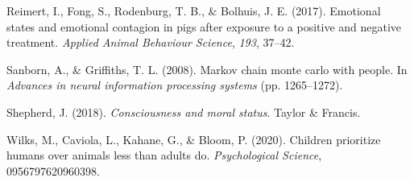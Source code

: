 \documentclass[10pt, letterpaper]{article}
\begin{document}
\leavevmode\hypertarget{ref-reimert2017emotional}{}%
Reimert, I., Fong, S., Rodenburg, T. B., \& Bolhuis, J. E. (2017).
Emotional states and emotional contagion in pigs after exposure to a
positive and negative treatment. \emph{Applied Animal Behaviour
Science}, \emph{193}, 37--42.

\leavevmode\hypertarget{ref-sanborn2008markov}{}%
Sanborn, A., \& Griffiths, T. L. (2008). Markov chain monte carlo with
people. In \emph{Advances in neural information processing systems} (pp.
1265--1272).

\leavevmode\hypertarget{ref-shepherd2018consciousness}{}%
Shepherd, J. (2018). \emph{Consciousness and moral status}. Taylor \&
Francis.

\leavevmode\hypertarget{ref-wilks2020children}{}%
Wilks, M., Caviola, L., Kahane, G., \& Bloom, P. (2020). Children
prioritize humans over animals less than adults do. \emph{Psychological
Science}, 0956797620960398.


\end{document}
